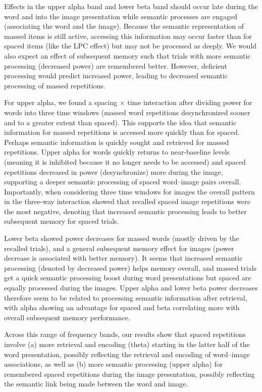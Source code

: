 Effects in the upper alpha band and lower beta band should occur late during the word and into the image presentation while semantic processes are engaged (associating the word and the image).  Because the semantic representation of massed items is still active, accessing this information may occur faster than for spaced items (like the LPC effect) but may not be processed as deeply.  We would also expect an effect of subsequent memory such that trials with more semantic processing (decreased power) are remembered better.  However, deficient processing would predict increased power, leading to decreased semantic processing of massed repetitions.

\cbstart
For upper alpha, we found a spacing $\times$ time interaction after dividing power for words into three time windows (massed word repetitions desynchronized sooner and to a greater extent than spaced). \cbend This supports the idea that semantic information for massed repetitions is accessed more quickly than for spaced.  Perhaps semantic information is quickly sought and retrieved for massed repetitions.  Upper alpha for words quickly returns to near-baseline levels (meaning it is inhibited because it no longer needs to be accessed) and spaced repetitions decreased in power (desynchronize) more during the image, supporting a deeper semantic processing of spaced word--image pairs overall.  Importantly, when considering three time windows for images the overall pattern in the three-way interaction showed that recalled spaced image repetitions were the most negative, denoting that increased semantic processing leads to better subsequent memory for spaced trials.

Lower beta showed power decreases for massed words (mostly driven by the recalled trials), and a general subsequent memory effect for images (power decrease is associated with better memory).  It seems that increased semantic processing (denoted by decreased power) helps memory overall, and massed trials get a quick semantic processing boost during word presentations but spaced are equally processed during the images.  Upper alpha and lower beta power decreases therefore seem to be related to processing semantic information after retrieval, with alpha showing an advantage for spaced and beta correlating more with overall subsequent memory performance.

\cbstart
Across this range of frequency bands, our results show that spaced repetitions involve (a) more retrieval and encoding (theta) starting in the latter half of the word presentation, possibly reflecting the retrieval and encoding of word--image associations, as well as (b) more semantic processing (upper alpha) for remembered spaced repetitions during the image presentation, possibly reflecting the semantic link being made between the word and image.
\cbend

